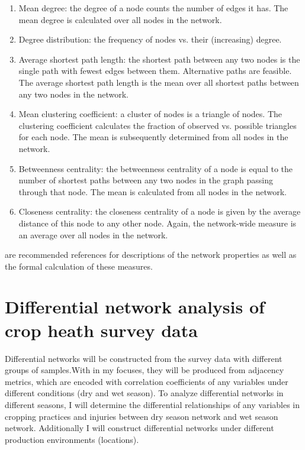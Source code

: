 \begin{enumerate}
\item Mean degree: the degree of a node counts the number of edges it has. The mean degree is calculated over all nodes in the network.
\item Degree distribution: the frequency of nodes vs. their (increasing) degree.
\item Average shortest path length: the shortest path between any two nodes is the single path with fewest edges between them. Alternative paths are feasible. The average shortest path length is the mean over all shortest paths between any two nodes in the network.
\item Mean clustering coefficient: a cluster of nodes is a triangle of nodes. The clustering coefficient calculates the fraction of observed vs. possible triangles for each node. The mean is subsequently determined from all nodes in the network.
\item Betweenness centrality: the betweenness centrality of a node is equal to the number of shortest paths between any two nodes in the graph passing through that node. The mean is calculated from all nodes in the network.
\item Closeness centrality: the closeness centrality of a node is given by the average distance of this node to any other node. Again, the network-wide measure is an average over all nodes in the network.
\end{enumerate}

 are recommended references for descriptions of the network properties as well as the formal calculation of these measures.

\section*{Differential network analysis of crop heath survey data}


Differential networks will be constructed from the survey data with different groups of samples.With in my focuses, they will be produced from  adjacency metrics, which are encoded with correlation coefficients of any variables under different conditions (dry and wet season). To analyze differential networks in different seasons, I will determine the differential relationships of any variables in cropping practices and injuries between dry season network and wet season network. Additionally I will construct differential networks under different production environments (locations).

